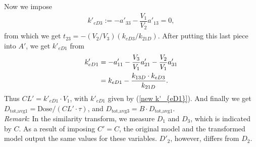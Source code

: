 Now we impose 
\begin{align}
k'_{eD3} := -a'_{33} - \dfrac{V_1}{V_2}a'_{13} = 0,
\end{align}
from which we get $t_{23} = -(V_2/V_3)(k_{eD3}/k_{21D})$. After putting this last piece into $A'$, we get $k'_{eD1}$ from
\begin{align}
k'_{eD1} &= -a'_{11} - \dfrac{V_3}{V_1}a'_{21} - \dfrac{V_2}{V_1}a'_{31} \nonumber \\ 
&= k_{eD1} - \dfrac{k_{13D} \cdot k_{eD3}}{k_{21D}}. \label{new k'_{eD1}}
\end{align}
Thus $CL' = k'_{eD1} \cdot V_1$, with $k'_{eD1}$ given by (\ref{new k'_{eD1}}). And finally we get $D_{\text{tot,avg}1} = \text{Dose}/(CL' \cdot \tau)$, and $D_{\text{tot,avg}3} = B \cdot D_{\text{tot,avg}1}$. \\

\textit{Remark}: In the similarity transform, we measure $D_1$ and $D_3$, which is indicated by $C$. As a result of imposing $C' = C$, the original model and the transformed model output the same values for these variables. $D'_2$, however, differs from $D_2$.